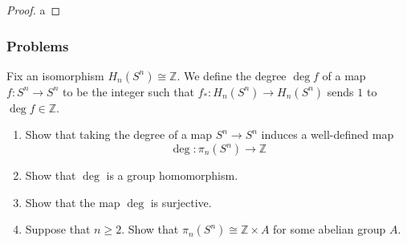 \begin{proof}
    a
\end{proof}






\subsubsection{Problems}

\begin{problem}[]\label{pset1-degree}
        Fix an isomorphism $H_n\left( S^{n} \right) \cong \mathbb{Z}$.
        We define the degree $\deg f$ of a map
        $f \colon S^{n} \to S^{n}$ to be the integer such that
        $f_* \colon H_n(S^{n}) \to H_n(S^{n})$ sends $1$ to
        $\deg f \in \mathbb{Z}$.
        \begin{enumerate}
            \item Show that taking the degree of a map
                $S^{n} \to S^{n}$ induces a well-defined
                map
                \[
                \deg \colon \pi_n(S^{n}) \to \mathbb{Z}
                \] 
            \item Show that $\deg $ is a group homomorphism.
            \item Show that the map $\deg$ is surjective.
            \item Suppose that $n\ge 2$. Show that
                $\pi_n\left( S^{n} \right) \cong
                \mathbb{Z} \times A$ for some abelian group $A$.
        \end{enumerate}
    \end{problem}

